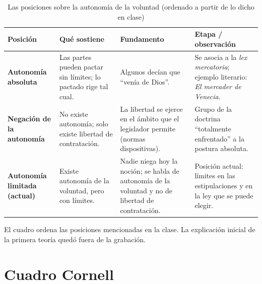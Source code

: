 \documentclass[12pt,oneside]{book}
\begin{document}
\begin{table}[H]
\centering
\caption{Las posiciones sobre la autonom\'ia de la voluntad (ordenado a partir de lo dicho en clase)}
\small
\begin{tabularx}{\textwidth}{
    >{\raggedright\arraybackslash}p{}
    >{\raggedright\arraybackslash}X
    >{\raggedright\arraybackslash}X
    >{\raggedright\arraybackslash}X
}
\toprule
\textbf{Posici\'on} & \textbf{Qu\'e sostiene} & \textbf{Fundamento} & \textbf{Etapa / observaci\'on} \\
\midrule
\textbf{Autonom\'ia absoluta} &
Las partes pueden pactar sin l\'imites; lo pactado rige tal cual. &
Algunos decían que ``ven\'ia de Dios''. &
Se asocia a la \emph{lex mercatoria}; ejemplo literario: \emph{El mercader de Venecia}. \\
\addlinespace
\textbf{Negaci\'on de la autonom\'ia} &
No existe autonom\'ia; solo existe libertad de contrataci\'on. &
La libertad se ejerce en el \'ambito que el legislador permite (normas dispositivas). &
Grupo de la doctrina ``totalmente enfrentado'' a la postura absoluta. \\
\addlinespace
\textbf{Autonom\'ia limitada (actual)} &
Existe autonom\'ia de la voluntad, pero con l\'imites. &
Nadie niega hoy la noci\'on; se habla de autonom\'ia de la voluntad y no de libertad de contrataci\'on. &
Posici\'on actual: l\'imites en las estipulaciones y en la ley que se puede elegir. \\
\bottomrule
\end{tabularx}
\end{table}

\begin{note}
El cuadro ordena las posiciones mencionadas en la clase. La explicaci\'on inicial de la primera teor\'ia qued\'o fuera de la grabaci\'on.
\end{note}

\section{Cuadro Cornell}
\end{document}
